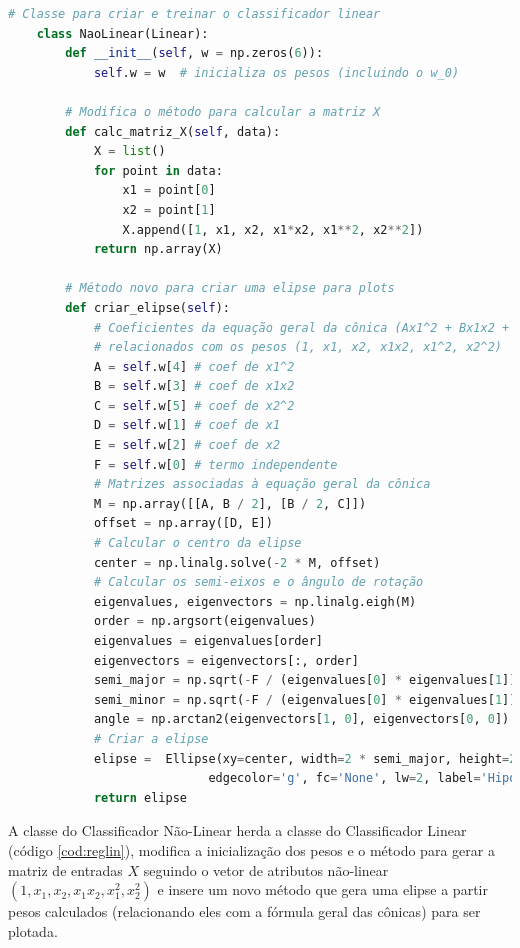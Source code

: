 \begin{lstlisting}[language=Python, caption=Classificador por Regressão Não-Linear, label=cod:reg_naolin]
    # Classe para criar e treinar o classificador linear
    class NaoLinear(Linear):
        def __init__(self, w = np.zeros(6)):
            self.w = w  # inicializa os pesos (incluindo o w_0)
        
        # Modifica o método para calcular a matriz X
        def calc_matriz_X(self, data):
            X = list()
            for point in data:
                x1 = point[0]
                x2 = point[1]
                X.append([1, x1, x2, x1*x2, x1**2, x2**2])
            return np.array(X)
        
        # Método novo para criar uma elipse para plots
        def criar_elipse(self):
            # Coeficientes da equação geral da cônica (Ax1^2 + Bx1x2 + Cx2^2 + Dx1 + Ex2 + F=0)
            # relacionados com os pesos (1, x1, x2, x1x2, x1^2, x2^2)
            A = self.w[4] # coef de x1^2
            B = self.w[3] # coef de x1x2
            C = self.w[5] # coef de x2^2
            D = self.w[1] # coef de x1
            E = self.w[2] # coef de x2
            F = self.w[0] # termo independente
            # Matrizes associadas à equação geral da cônica
            M = np.array([[A, B / 2], [B / 2, C]])
            offset = np.array([D, E])
            # Calcular o centro da elipse
            center = np.linalg.solve(-2 * M, offset)
            # Calcular os semi-eixos e o ângulo de rotação
            eigenvalues, eigenvectors = np.linalg.eigh(M)
            order = np.argsort(eigenvalues)
            eigenvalues = eigenvalues[order]
            eigenvectors = eigenvectors[:, order]
            semi_major = np.sqrt(-F / (eigenvalues[0] * eigenvalues[1])) / np.sqrt(eigenvalues[0])
            semi_minor = np.sqrt(-F / (eigenvalues[0] * eigenvalues[1])) / np.sqrt(eigenvalues[1])
            angle = np.arctan2(eigenvectors[1, 0], eigenvectors[0, 0])
            # Criar a elipse
            elipse =  Ellipse(xy=center, width=2 * semi_major, height=2 * semi_minor, angle=np.degrees(angle),
                            edgecolor='g', fc='None', lw=2, label='Hipótese (g)')
            return elipse
\end{lstlisting}

A classe do Classificador Não-Linear herda a classe do Classificador Linear (código \ref{cod:reglin}), modifica a inicialização dos pesos e o método para gerar a matriz de entradas $X$ seguindo o vetor de atributos não-linear $(1, x_1, x_2, x_1x_2, x_1^2, x_2^2)$ e insere um novo método que gera uma elipse a partir pesos calculados (relacionando eles com a fórmula geral das cônicas) para ser plotada.

